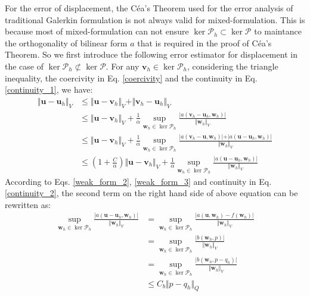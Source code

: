 For the error of displacement, the Céa's Theorem used for the error analysis of traditional Galerkin formulation is not always valid for mixed-formulation.
This is because most of mixed-formulation can not ensure $\ker \mathcal P_h \subset \ker \mathcal P$ to maintance the orthogonality of bilinear form $a$ that is required in the proof of Céa's Theorem.
So we first introduce the following error estimator for displacement in the case of $\ker \mathcal P_h \not\subset \ker \mathcal P$.
For any $\boldsymbol v_h \in \ker \mathcal P_h$, considering the triangle inequality, the coercivity in Eq. \eqref{coercivity} and the continuity in Eq. \eqref{continuity_1}, we have:
\begin{equation}\label{u_estimator_1}
\begin{split}
\Vert \boldsymbol u- \boldsymbol u_{h}\Vert_{V} &\le \Vert \boldsymbol u-\boldsymbol v_{h}\Vert_{V} + \Vert \boldsymbol v_{h}-\boldsymbol u_{h}\Vert_{V} \\
&\le \Vert \boldsymbol u-\boldsymbol v_{h}\Vert_{V} + \frac{1}{\alpha} \sup_{\boldsymbol w_{h}\in \ker \mathcal P_{h}}\frac{\vert a(\boldsymbol v_{h}-\boldsymbol u_{h}, \boldsymbol w_{h})\vert}{\Vert \boldsymbol w_{h}\Vert_{V}} \\
&\le \Vert \boldsymbol u-\boldsymbol v_{h}\Vert_{V} + \frac{1}{\alpha} \sup_{\boldsymbol w_{h}\in \ker \mathcal P_{h}}\frac{\vert a(\boldsymbol v_{h}-\boldsymbol u, \boldsymbol w_{h})\vert + \vert a(\boldsymbol u-\boldsymbol u_{h}, \boldsymbol w_{h})\vert}{\Vert \boldsymbol w_{h}\Vert_{V}} \\
&\le (1+\frac{C}{\alpha})\Vert \boldsymbol u-\boldsymbol v_{h} \Vert_{V} + \frac{1}{\alpha}\sup_{\boldsymbol w_{h}\in \ker \mathcal P_{h}}\frac{\vert a(\boldsymbol u-\boldsymbol u_{h}, \boldsymbol w_{h})\vert}{\Vert \boldsymbol w_{h}\Vert_{V}}
\end{split} 
\end{equation}
According to Eqs. \eqref{weak_form_2}, \eqref{weak_form_3} and continuity in Eq. \eqref{continuity_2}, the second term on the right hand side of above equation can be rewritten as:
\begin{equation}\label{u_estimator_2}
\begin{split}
\sup_{\boldsymbol w_h \in \ker \mathcal P_h} \frac{\vert a(\boldsymbol u-\boldsymbol u_{h},\boldsymbol w_{h})\vert}{\Vert \boldsymbol w_h \Vert_V} &= 
\sup_{\boldsymbol w_h \in \ker \mathcal P_h} \frac{\vert a(\boldsymbol u,\boldsymbol w_{h}) - f(\boldsymbol w_{h})\vert}{\Vert \boldsymbol w_h \Vert_V} \\
&= \sup_{\boldsymbol w_h \in \ker \mathcal P_h} \frac{\vert b(\boldsymbol w_{h},p)\vert}{\Vert \boldsymbol w_h\Vert_V} \\
&= \sup_{\boldsymbol w_h \in \ker \mathcal P_h} \frac{\vert b(\boldsymbol w_{h},p-q_{h})\vert}{\Vert \boldsymbol w_h\Vert_V} \\
&\le C_b \Vert p - q_h \Vert_Q
\end{split}
\end{equation}
